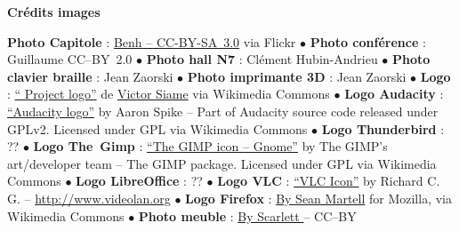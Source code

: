 
\vfill
\begin{center}
\textcolor{Cdl}{\textbf{Crédits images}} \par
{\tiny
 \textbf{Photo Capitole} : \href{https://www.flickr.com/photos/blieusong/6986608500/in/set-72157629942158013}{Benh  -- CC-BY-SA~3.0} via Flickr  \textcolor{Cdl}{$\bullet$}
 \textbf{Photo conférence } : Guillaume  CC--BY~2.0 \textcolor{Cdl}{$\bullet$}
 \textbf{Photo hall N7} : Clément Hubin-Andrieu \textcolor{Cdl}{$\bullet$}
 \textbf{Photo clavier braille} : Jean Zaorski \textcolor{Cdl}{$\bullet$}
 \textbf{Photo imprimante 3D} : Jean Zaorski \textcolor{Cdl}{$\bullet$}
 \textbf{Logo } : \href{https://commons.wikimedia.org/wiki/File\%3AOfficial_gnu.svg"><img width="512" alt="Official gnu" src="//upload.wikimedia.org/wikipedia/commons/thumb/3/39/Official_gnu.svg/512px-Official_gnu.svg.png}{“ Project logo”} de \href{mailto:vcopovi@wanadoo.fr}{Victor Siame} via Wikimedia Commons \textcolor{Cdl}{$\bullet$}
 \textbf{Logo Audacity} : \href{https://commons.wikimedia.org/wiki/File:Audacity_Logo.svg#/media/File:Audacity_Logo.svg}{“Audacity logo”} by Aaron Spike -- Part of Audacity source code released under GPLv2. Licensed under GPL via Wikimedia Commons \textcolor{Cdl}{$\bullet$}
 \textbf{Logo Thunderbird} : ?? \textcolor{Cdl}{$\bullet$}
 \textbf{Logo The~Gimp} : \href{https://commons.wikimedia.org/wiki/File:The_GIMP_icon_-_gnome.svg#/media/File:The_GIMP_icon_-_gnome.svg}{“The GIMP icon -- Gnome”} by The GIMP's art/developer team -- The GIMP package. Licensed under GPL via Wikimedia Commons \textcolor{Cdl}{$\bullet$}
 \textbf{Logo LibreOffice} : ?? \textcolor{Cdl}{$\bullet$}
 \textbf{Logo VLC} : \href{https://commons.wikimedia.org/wiki/File:VLC_Icon.svg#/media/File:VLC_Icon.svg}{“VLC Icon”} by Richard C. G.  -- \url{http://www.videolan.org} \textcolor{Cdl}{$\bullet$}
 \textbf{Logo Firefox} : \href{https://commons.wikimedia.org/wiki/File\%3AMozilla_Firefox_logo_2013.svg}{By Sean Martell} for Mozilla, via Wikimedia Commons \textcolor{Cdl}{$\bullet$}
 \textbf{Photo meuble} : \href{https://www.opendesk.cc/fin/fin-lockers}{By Scarlett } -- CC--BY

}
\end{center}
